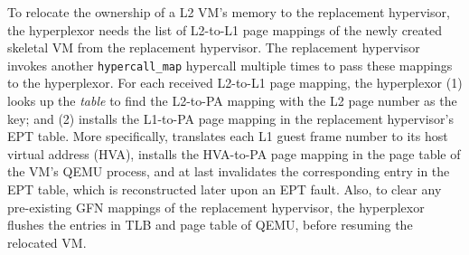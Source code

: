 To relocate the ownership of a L2 VM's memory to the replacement hypervisor, the hyperplexor
needs  the list of L2-to-L1 page mappings of the newly created skeletal VM from the replacement hypervisor.
The replacement hypervisor invokes another \texttt{hypercall\_map} hypercall multiple times
to pass these mappings to the hyperplexor. For each received L2-to-L1 page mapping, the hyperplexor 
(1) looks up the {\em \arch table} to find the L2-to-PA mapping with the L2 page number 
as the key; and (2) installs the L1-to-PA page mapping in the replacement hypervisor's 
EPT table. More specifically, \arch translates each L1 guest frame number to its  host virtual address (HVA), 
installs the HVA-to-PA page mapping in the page table of the VM's QEMU process, and at last invalidates the 
corresponding entry in the EPT table, which is reconstructed later upon an EPT  fault.
Also, to clear any pre-existing GFN mappings of the replacement hypervisor, the hyperplexor flushes 
the entries in TLB and page table of QEMU, before resuming the relocated VM.

%
%


